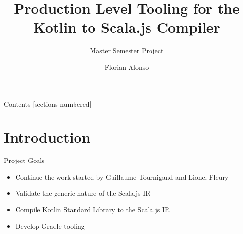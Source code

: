 \documentclass[10pt,usenames,dvipsnames]{beamer}
\title{Production Level Tooling for the Kotlin to Scala.js Compiler}
\subtitle{Master Semester Project}
\date{}
\author{Florian Alonso}
\institute{EPFL - Programming Methods Laboratory (LAMP) }
\begin{document}
\begin{frame}
  \titlepage
\end{frame}

\begin{frame}[fragile]{Contents}
  [sections numbered]
  \tableofcontents[hideallsubsections]
\end{frame}

\section{Introduction}

\begin{frame}{Project Goals}
 \begin{itemize}
  \item Continue the work started by Guillaume Tournigand and Lionel Fleury
  \item Validate the generic nature of the Scala.js IR
  \item Compile Kotlin Standard Library to the Scala.js IR
  \item Develop Gradle tooling
 \end{itemize}

\end{frame}
\end{document}
